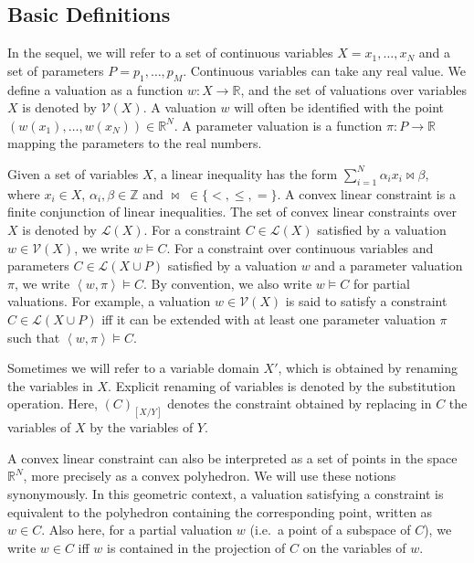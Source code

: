 \documentclass{llncs}
\newcommand{\Reals}{\ensuremath{\mathbb{R}}}
\newcommand{\Ints}{\ensuremath{\mathbb{Z}}}
\newcommand{\valuation}{\ensuremath{\mathcal{V}}}
\begin{document}
\subsection{Basic Definitions}
In the sequel, we will refer to a set of continuous variables $X =
{x_1, \dots, x_N}$ and a set of parameters $P = {p_1, \dots, p_M}$. 
Continuous variables can take any real value. We define a valuation as
a function $w: X \rightarrow \Reals$, and the set of valuations
over variables $X$ is denoted by $\valuation(X)$. A valuation $w$ will
often be identified with the point $(w(x_1), \dots, w(x_N)) \in
\Reals^N$. A parameter valuation is a function $\pi: P \rightarrow
\Reals$ mapping the parameters to the  real numbers.

Given a set of variables $X$, a linear inequality has the form $\sum
_{i=1}^{N} \alpha_i x_i \bowtie \beta,$ where $x_i \in X$,
$\alpha_i, \beta \in \Ints$ and $\bowtie\; \in \{<, \leq, =\}$. A
convex linear constraint is a finite conjunction of linear
inequalities. The set of convex linear constraints over $X$ is denoted
by $\mathcal{L}(X)$. For a constraint $C \in \mathcal{L}(X)$ satisfied
by a valuation $w \in \mathcal{V}(X)$, we write $w \models C$. For a
constraint over continuous variables and parameters $C \in
\mathcal{L}(X \cup P)$ satisfied by a valuation $w$ and a parameter
valuation $\pi$, we write $\left<w, \pi\right> \models C$. By
convention, we also write $w \models C$ for partial valuations. For
example, a valuation $w \in \mathcal{V}(X)$ is said to satisfy a
constraint $C \in \mathcal{L}(X \cup P)$ iff it can be extended with
at least one parameter valuation $\pi$ such that $\left<w, \pi\right>
\models C$.

Sometimes we will refer to a variable domain $X'$, which is obtained
by renaming the variables in $X$. Explicit renaming of variables is
denoted by the substitution operation. Here, $(C)_{[X/Y]}$ denotes the
constraint obtained by replacing in $C$ the variables of $X$ by the variables
of $Y$.

A convex linear constraint can also be interpreted as a set of points
in the space $\Reals^N$, more precisely as a convex polyhedron. We
will use these notions synonymously. In this geometric context, a
valuation satisfying a constraint is equivalent to the polyhedron
containing the corresponding point, written as $w \in C$. Also here,
for a partial valuation $w$ (i.e.~a point of a subspace of $C$), we
write $w \in C$ iff $w$ is contained in the projection of $C$ on the
variables of $w$. 
\end{document}
